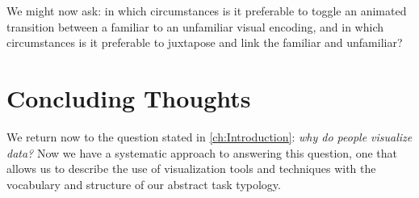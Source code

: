 We might now ask: in which circumstances is it preferable to toggle an animated transition between a familiar to an unfamiliar visual encoding, and in which circumstances is it preferable to juxtapose and link the familiar and unfamiliar?


\section{Concluding Thoughts}
\label{conclusions:final}


We return now to the question stated in \autoref{ch:Introduction}: {\it why do people visualize data?}
Now we have a systematic approach to answering this question, one that allows us to describe the use of visualization tools and techniques with the vocabulary and structure of our abstract task typology.

